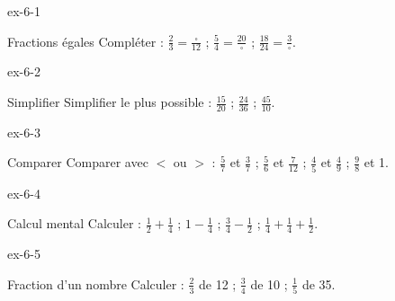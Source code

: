 \clearpage{}
\begin{blocLivre}{ex-6-1}\begin{exercice}[1]{Fractions égales}
Compléter : $\frac23=\frac{\square}{12}$ ; $\frac54=\frac{20}{\square}$ ; $\frac{18}{24}=\frac3{\square}$.
\end{exercice}\end{blocLivre}
\begin{blocLivre}{ex-6-2}\begin{exercice}[1]{Simplifier}
Simplifier le plus possible : $\frac{15}{20}$ ; $\frac{24}{36}$ ; $\frac{45}{10}$.
\end{exercice}\end{blocLivre}
\begin{blocLivre}{ex-6-3}\begin{exercice}[1]{Comparer}
Comparer avec $<$ ou $>$ : $\frac57$ et $\frac37$ ; $\frac56$ et $\frac7{12}$ ; $\frac45$ et $\frac49$ ; $\frac98$ et 1.
\end{exercice}\end{blocLivre}
\begin{blocLivre}{ex-6-4}\begin{exercice}[1]{Calcul mental}
Calculer : $\frac12+\frac14$ ; $1-\frac14$ ; $\frac34-\frac12$ ; $\frac14+\frac14+\frac12$.
\end{exercice}\end{blocLivre}
\begin{blocLivre}{ex-6-5}\begin{exercice}[1]{Fraction d’un nombre}
Calculer : $\frac23$ de 12 ; $\frac34$ de 10 ; $\frac15$ de 35.
\end{exercice}\end{blocLivre}


